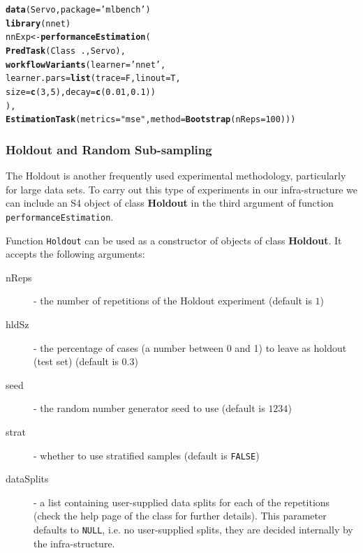 \documentclass[10pt,a4paper]{article}\usepackage[]{graphicx}\usepackage[]{color}
\makeatletter
\newcommand{\hlnum}[1]{\textcolor[rgb]{0.686,0.059,0.569}{#1}}%
\newcommand{\hlstr}[1]{\textcolor[rgb]{0.192,0.494,0.8}{#1}}%
\newcommand{\hlopt}[1]{\textcolor[rgb]{0,0,0}{#1}}%
\newcommand{\hlstd}[1]{\textcolor[rgb]{0.345,0.345,0.345}{#1}}%
\newcommand{\hlkwb}[1]{\textcolor[rgb]{0.69,0.353,0.396}{#1}}%
\newcommand{\hlkwc}[1]{\textcolor[rgb]{0.333,0.667,0.333}{#1}}%
\newcommand{\hlkwd}[1]{\textcolor[rgb]{0.737,0.353,0.396}{\textbf{#1}}}%
\newenvironment{kframe}{%
 \def\at@end@of@kframe{}%
 \ifinner\ifhmode%
  \def\at@end@of@kframe{\end{minipage}}%
  \begin{minipage}{\columnwidth}%
 \fi\fi%
 \def\FrameCommand##1{\hskip\@totalleftmargin \hskip-\fboxsep
 \colorbox{shadecolor}{##1}\hskip-\fboxsep
     \hskip-\linewidth \hskip-\@totalleftmargin \hskip\columnwidth}%
 \MakeFramed {\advance\hsize-\width
   \@totalleftmargin\z@ \linewidth\hsize
   \@setminipage}}%
 {\par\unskip\endMakeFramed%
 \at@end@of@kframe}
\newenvironment{knitrout}{}{} %
\makeatother
\begin{document}
\begin{knitrout}\footnotesize
{}\color{fgcolor}\begin{kframe}
\begin{alltt}
\hlkwd{data}\hlstd{(Servo,}\hlkwc{package}\hlstd{=}\hlstr{'mlbench'}\hlstd{)}
\hlkwd{library}\hlstd{(nnet)}
\hlstd{nnExp} \hlkwb{<-} \hlkwd{performanceEstimation}\hlstd{(}
  \hlkwd{PredTask}\hlstd{(Class} \hlopt{~} \hlstd{.,Servo),}
  \hlkwd{workflowVariants}\hlstd{(}\hlkwc{learner}\hlstd{=}\hlstr{'nnet'}\hlstd{,}
                   \hlkwc{learner.pars}\hlstd{=}\hlkwd{list}\hlstd{(}\hlkwc{trace}\hlstd{=F,}\hlkwc{linout}\hlstd{=T,}
                       \hlkwc{size}\hlstd{=}\hlkwd{c}\hlstd{(}\hlnum{3}\hlstd{,}\hlnum{5}\hlstd{),}\hlkwc{decay}\hlstd{=}\hlkwd{c}\hlstd{(}\hlnum{0.01}\hlstd{,}\hlnum{0.1}\hlstd{))}
          \hlstd{),}
  \hlkwd{EstimationTask}\hlstd{(}\hlkwc{metrics}\hlstd{=}\hlstr{"mse"}\hlstd{,}\hlkwc{method}\hlstd{=}\hlkwd{Bootstrap}\hlstd{(}\hlkwc{nReps}\hlstd{=}\hlnum{100}\hlstd{)))}
\end{alltt}
\end{kframe}
\end{knitrout}

\subsubsection{Holdout and Random Sub-sampling}

The Holdout is another frequently used experimental methodology,
particularly for large data sets. To carry out this type of
experiments in our infra-structure we can include an S4 object of
class \textbf{Holdout} in the third argument of function
\texttt{performanceEstimation}.

Function \texttt{Holdout} can be used as a constructor of
objects of class \textbf{Holdout}. It accepts the following
arguments:

\begin{description}
\item[nReps] - the number of repetitions of the Holdout experiment (default is $1$)
\item[hldSz] - the percentage  of cases (a number between 0 and 1) to leave as holdout (test set) (default is $0.3$)
\item[seed] - the random number generator seed to use (default is $1234$)
\item[strat] - whether to use stratified samples (default is \texttt{FALSE})
\item[dataSplits] - a list containing user-supplied data splits
  for each of the repetitions (check the help page of the
  class for further details). This parameter defaults to
  \texttt{NULL}, i.e. no user-supplied splits, they are decided
  internally by the infra-structure.
\end{description}
\end{document}
